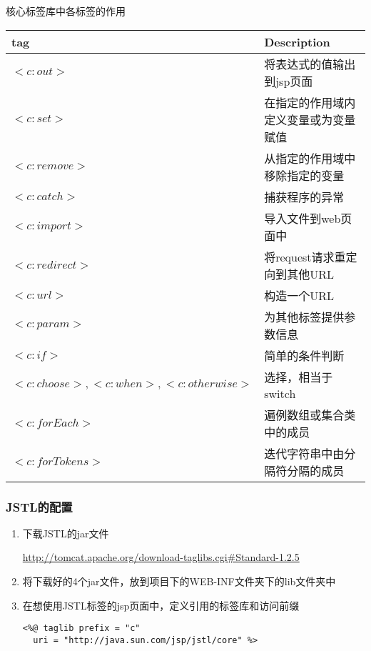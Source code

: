 \documentclass{beamer}
\begin{document}
\begin{frame}{核心标签库中各标签的作用}
\begin{table}
\begin{tabular}{p{10em}l}
\toprule
\textbf{tag}&\textbf{Description}\\
\midrule
$<c:out>$&将表达式的值输出到jsp页面\\
$<c:set>$&在指定的作用域内定义变量或为变量赋值\\
$<c:remove>$&从指定的作用域中移除指定的变量\\
$<c:catch>$&捕获程序的异常\\
$<c:import>$&导入文件到web页面中\\
$<c:redirect>$&将request请求重定向到其他URL\\
$<c:url>$&构造一个URL\\
$<c:param>$&为其他标签提供参数信息\\
$<c:if>$&简单的条件判断\\
$<c:choose>, <c:when>, <c:otherwise>$&选择，相当于switch\\
$<c:forEach>$&遍例数组或集合类中的成员\\
$<c:forTokens>$&迭代字符串中由分隔符分隔的成员\\
\bottomrule
\end{tabular}
\end{table}
\end{frame}
\begin{frame}[fragile]
\frametitle{JSTL的配置}
\begin{enumerate}
\item
下载JSTL的jar文件

\url{http://tomcat.apache.org/download-taglibs.cgi#Standard-1.2.5}
\item
将下载好的4个jar文件，放到项目下的WEB-INF文件夹下的lib文件夹中
\item
在想使用JSTL标签的jsp页面中，定义引用的标签库和访问前缀
\begin{lstlisting}
<%@ taglib prefix = "c" 
  uri = "http://java.sun.com/jsp/jstl/core" %>
\end{lstlisting}
\end{enumerate}
\end{frame}
\end{document}
